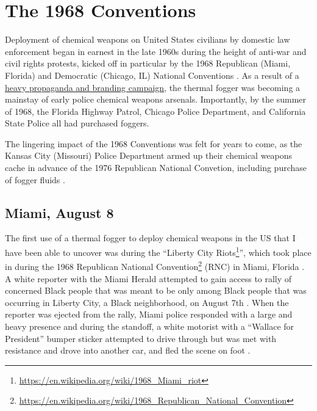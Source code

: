 \documentclass[
  12pt,
]{krantz}
\renewcommand{\href}[2]{#2\footnote{\url{#1}}}
\begin{document}
\hypertarget{the-1968-conventions}{%
\chapter*{The 1968 Conventions}\label{the-1968-conventions}}


Deployment of chemical weapons on United States civilians by domestic law enforcement began in earnest in the late 1960s during the height of anti-war and civil rights protests, kicked off in particular by the 1968 Republican (Miami, Florida) and Democratic (Chicago, IL) National Conventions \citep{McArdle2018, TaylorandMorris2018}.
As a result of a \protect\hyperlink{TheReturn}{heavy propaganda and branding campaign}, the thermal fogger was becoming a mainstay of early police chemical weapons arsenals.
Importantly, by the summer of 1968, the Florida Highway Patrol, Chicago Police Department, and California State Police all had purchased foggers.

The lingering impact of the 1968 Conventions was felt for years to come, as the Kansas City (Missouri) Police Department armed up their chemical weapons cache in advance of the 1976 Republican National Convetion, including purchase of fogger fluids \citep{Hudson1976}.

\hypertarget{MiamiFL1968_08_08}{%
\section*{Miami, August 8}\label{MiamiFL1968_08_08}}


The first use of a thermal fogger to deploy chemical weapons in the US that I have been able to uncover was during the ``\href{https://en.wikipedia.org/wiki/1968_Miami_riot}{Liberty City Riots}'', which took place in during the \href{https://en.wikipedia.org/wiki/1968_Republican_National_Convention}{1968 Republican National Convention} (RNC) in Miami, Florida \citep{Tschenschlok1995, Tschenschlok1996, McArdle2018}.
A white reporter with the Miami Herald attempted to gain access to rally of concerned Black people that was meant to be only among Black people that was occurring in Liberty City, a Black neighborhood, on August 7th \citep{Tschenschlok1995, Tschenschlok1996}.
When the reporter was ejected from the rally, Miami police responded with a large and heavy presence and during the standoff, a white motorist with a ``Wallace for President'' bumper sticker attempted to drive through but was met with resistance and drove into another car, and fled the scene on foot \citep{Tschenschlok1995, Lorentzen2018}.
\end{document}
